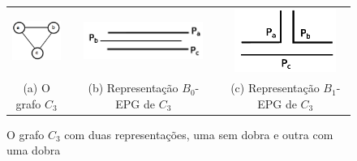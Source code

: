 \begin{figure}[h]
  \centering
  \begin{tabular}{ c p{0.15cm} c p{0.15cm} c }
    \includegraphics[width=2.3cm]{./img/trianguloabc.png} && \includegraphics[width=4cm]{./img/edge-clique.png} & &
    \includegraphics[width=3.3cm]{./img/claw-clique.png}
    \\
    \footnotesize %
    (a) O grafo $C_3$ && \footnotesize(b) Representação $B_0$-EPG de $C_3$ && \footnotesize (c) Representação $B_1$-EPG de $C_3$\\

  \end{tabular}

 \caption{O grafo $ C_3 $ com duas representações, uma sem dobra e outra com uma dobra} \label{fig:trianguloepgRepresentacao}
\end{figure}
